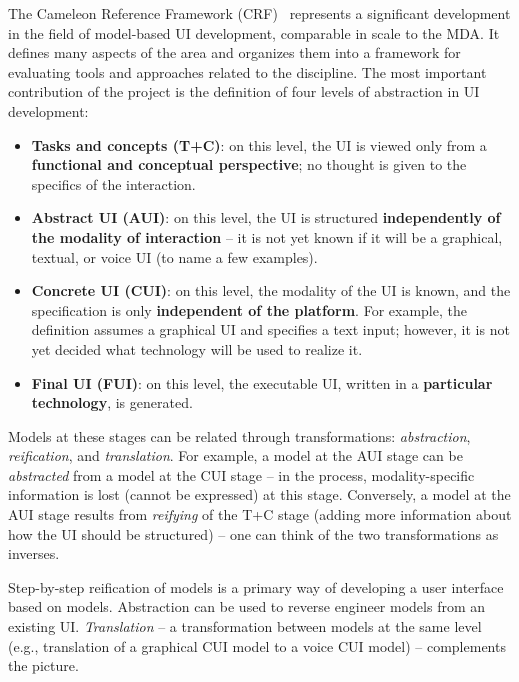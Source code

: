 The Cameleon Reference Framework (CRF)~\cite{calvary_cameleon_framework_2002, calvary_cameleon_glossary_2002} represents a significant development in the field of model-based UI development, comparable in scale to the MDA\@.
It defines many aspects of the area and organizes them into a framework for evaluating tools and approaches related to the discipline.
The most important contribution of the project is the definition of four levels of abstraction in UI development:
\begin{samepage}
\begin{itemize}
    \item \textbf{Tasks and concepts (T+C)}: on this level, the UI is viewed only from a \textbf{functional and conceptual perspective}; no thought is given to the specifics of the interaction.
    \item \textbf{Abstract UI (AUI)}: on this level, the UI is structured \textbf{independently of the modality of interaction} -- it is not yet known if it will be a graphical, textual, or voice UI (to name a few examples).
    \item \textbf{Concrete UI (CUI)}: on this level, the modality of the UI is known, and the specification is only \textbf{independent of the platform}. For example, the definition assumes a graphical UI and specifies a text input; however, it is not yet decided what technology will be used to realize it.
    \item \textbf{Final UI (FUI)}: on this level, the executable UI, written in a \textbf{particular technology}, is generated.
\end{itemize}
\end{samepage}
Models at these stages can be related through transformations: \emph{abstraction}, \emph{reification}, and \emph{translation}.
For example, a model at the AUI stage can be \emph{abstracted} from a model at the CUI stage -- in the process, modality-specific information is lost (cannot be expressed) at this stage.
Conversely, a model at the AUI stage results from \emph{reifying} of the T+C stage (adding more information about how the UI should be structured) -- one can think of the two transformations as inverses.

Step-by-step reification of models is a primary way of developing a user interface based on models.
Abstraction can be used to reverse engineer models from an existing UI\@.
\emph{Translation} -- a transformation between models at the same level (e.g., translation of a graphical CUI model to a voice CUI model) -- complements the picture.


